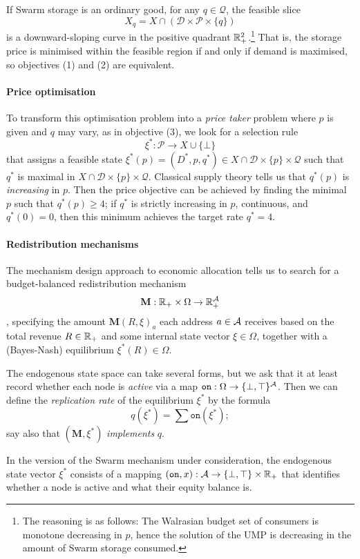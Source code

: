 If Swarm storage is an ordinary good, for any $q\in \mathcal{Q}$, the feasible slice 
\[
  X_q = X \cap (\mathcal{D}\times\mathcal{P}\times\{q\})
\]
is a downward-sloping curve in the positive quadrant $\mathbb{R}_+^2$.\footnote{The reasoning is as follows: The Walrasian budget set of consumers is monotone decreasing in $p$, hence the solution of the UMP is decreasing in the amount of Swarm storage consumed.}
%
That is, the storage price is minimised within the feasible region if and only if demand is maximised, so objectives (1) and (2) are equivalent.

\paragraph{Price optimisation}
To transform this optimisation problem into a \emph{price taker} problem where $p$ is given and $q$ may vary, as in objective (3), we look for a selection rule 
\[
  \xi^*:\mathcal{P}\rightarrow X\cup\{\bot\}
\]
that assigns a feasible state $\xi^*(p)=(D^*,p,q^*)\in X\cap \mathcal{D}\times\{p\}\times\mathcal{Q}$ such that $q^*$ is maximal in $X\cap \mathcal{D}\times\{p\}\times\mathcal{Q}$.
%
Classical supply theory tells us that $q^*(p)$ is \emph{increasing} in $p$. 
%
Then the price objective can be achieved by finding the minimal $p$ such that $q^*(p)\geq 4$; if $q^*$ is strictly increasing in $p$, continuous, and $q^*(0)=0$, then this minimum achieves the target rate $q^*=4$.

\paragraph{Redistribution mechanisms}
The mechanism design approach to economic allocation tells us to search for a budget-balanced redistribution mechanism
\[
  \mathbf{M}:\mathbb{R}_+ \times \Omega \rightarrow \mathbb{R}_+^{\mathcal{A}}
\],
specifying the amount $\mathbf{M}(R,\xi)_a$ each address $a\in\mathcal{A}$ receives based on the total revenue $R\in\mathbb{R}_+$ and some internal state vector $\xi\in\Omega$, together with a (Bayes-Nash) equilibrium $\xi^*(R)\in\Omega$.

The endogenous state space can take several forms, but we ask that it at least record whether each node is \emph{active} via a map $\mathtt{on}:\Omega\rightarrow \{\bot,\top\}^{\mathcal{A}}$.
%
Then we can define the \emph{replication rate} of the equilibrium $\xi^*$ by the formula
\[
  q(\xi^*) = \sum\mathtt{on}(\xi^*);
\]
say also that $(\mathbf{M},\xi^*)$ \emph{implements} $q$.

\begin{example}
  
  In the version of the Swarm mechanism under consideration, the endogenous state vector $\xi^*$ consists of a mapping $(\mathtt{on},x):\mathcal{A}\rightarrow \{\bot,\top\}\times\mathbb{R}_+$ that identifies whether a node is active and what their equity balance is.

\end{example}


